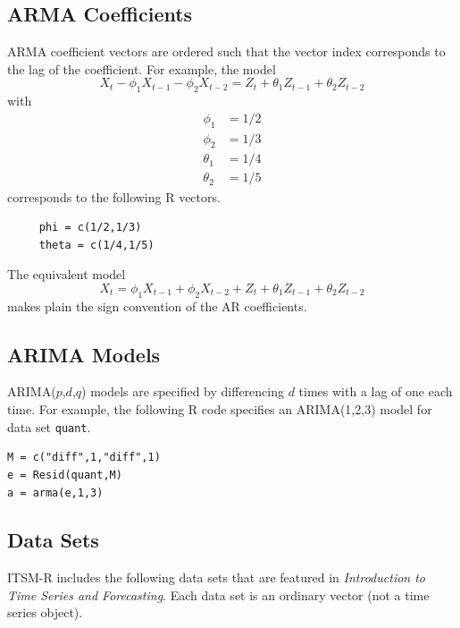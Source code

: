 \documentclass[11pt]{article}
\begin{document}
\subsection{ARMA Coefficients}
ARMA coefficient vectors are ordered such that
the vector index corresponds to the lag of the coefficient.
For example, the model
\[
X_t-\phi_1X_{t-1}-\phi_2X_{t-2}=Z_t+\theta_1Z_{t-1}+\theta_2Z_{t-2}
\]
with
\begin{align*}
\phi_1&=1/2\\
\phi_2&=1/3\\
\theta_1&=1/4\\
\theta_2&=1/5
\end{align*}
corresponds to the following R vectors.

\begin{verbatim}
     phi = c(1/2,1/3)
     theta = c(1/4,1/5)
\end{verbatim}

The equivalent model
\[
X_t=\phi_1X_{t-1}+\phi_2X_{t-2}
+Z_t+\theta_1Z_{t-1}+\theta_2Z_{t-2}
\]
makes plain the sign convention of the AR coefficients.

\subsection{ARIMA Models}
ARIMA($p$,$d$,$q$)
models are specified by differencing $d$ times with a lag of one each time.
For example, the following R code specifies an ARIMA(1,2,3) model
for data set {\tt quant}.

\begin{Verbatim}
M = c("diff",1,"diff",1)
e = Resid(quant,M)
a = arma(e,1,3)
\end{Verbatim}

\subsection{Data Sets}
ITSM-R includes the following data sets that are featured in
{\it Introduction to Time Series and Forecasting}.
Each data set is an ordinary vector (not a time series object).
\end{document}
